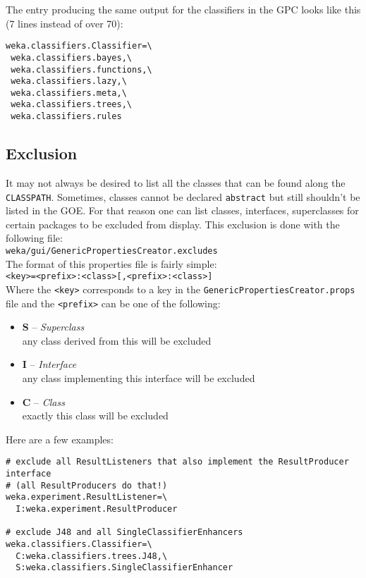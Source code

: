 \noindent The entry producing the same output for the classifiers in the GPC looks like this (7 lines instead of over 70):

\begin{verbatim}
weka.classifiers.Classifier=\
 weka.classifiers.bayes,\
 weka.classifiers.functions,\
 weka.classifiers.lazy,\
 weka.classifiers.meta,\
 weka.classifiers.trees,\
 weka.classifiers.rules
\end{verbatim}

\subsection{Exclusion}
It may not always be desired to list all the classes that can be found
along the \verb=CLASSPATH=. Sometimes, classes cannot be declared \verb=abstract=
but still shouldn't be listed in the GOE. For that reason one can list
classes, interfaces, superclasses for certain packages to be excluded
from display. This exclusion is done with the following file:\\

\verb=weka/gui/GenericPropertiesCreator.excludes=\\

\noindent The format of this properties file is fairly simple:\\

\verb^<key>=<prefix>:<class>[,<prefix>:<class>]^\\

\noindent Where the \verb=<key>= corresponds to a key in the
\verb=GenericPropertiesCreator.props= file and the \verb=<prefix>= can
be one of the following:

\begin{itemize}
\item \textbf{S} -- \textit{Superclass}\\
  any class derived from this will be excluded
\item \textbf{I} -- \textit{Interface}\\
  any class implementing this interface will be excluded
\item \textbf{C} -- \textit{Class}\\
  exactly this class will be excluded
\end{itemize}

\noindent Here are a few examples:

\begin{verbatim}
# exclude all ResultListeners that also implement the ResultProducer interface
# (all ResultProducers do that!)
weka.experiment.ResultListener=\
  I:weka.experiment.ResultProducer

# exclude J48 and all SingleClassifierEnhancers
weka.classifiers.Classifier=\
  C:weka.classifiers.trees.J48,\
  S:weka.classifiers.SingleClassifierEnhancer
\end{verbatim}

